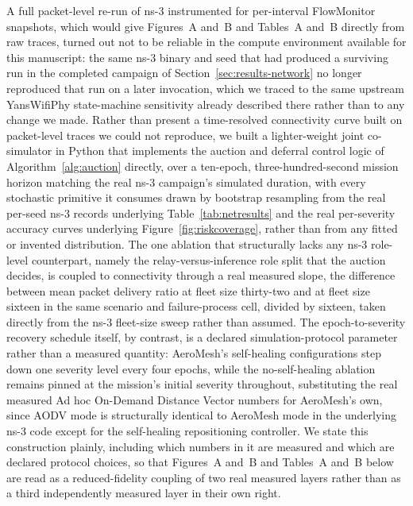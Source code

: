 \documentclass[drones,article,submit,moreauthors]{Definitions/mdpi}
\begin{document}
A full packet-level re-run of ns-3 instrumented for per-interval FlowMonitor snapshots, which would give Figures~A and~B and Tables~A and~B directly from raw traces, turned out not to be reliable in the compute environment available for this manuscript: the same ns-3 binary and seed that had produced a surviving run in the completed campaign of Section~\ref{sec:results-network} no longer reproduced that run on a later invocation, which we traced to the same upstream YansWifiPhy state-machine sensitivity already described there rather than to any change we made. Rather than present a time-resolved connectivity curve built on packet-level traces we could not reproduce, we built a lighter-weight joint co-simulator in Python that implements the auction and deferral control logic of Algorithm~\ref{alg:auction} directly, over a ten-epoch, three-hundred-second mission horizon matching the real ns-3 campaign's simulated duration, with every stochastic primitive it consumes drawn by bootstrap resampling from the real per-seed ns-3 records underlying Table~\ref{tab:netresults} and the real per-severity accuracy curves underlying Figure~\ref{fig:riskcoverage}, rather than from any fitted or invented distribution. The one ablation that structurally lacks any ns-3 role-level counterpart, namely the relay-versus-inference role split that the auction decides, is coupled to connectivity through a real measured slope, the difference between mean packet delivery ratio at fleet size thirty-two and at fleet size sixteen in the same scenario and failure-process cell, divided by sixteen, taken directly from the ns-3 fleet-size sweep rather than assumed. The epoch-to-severity recovery schedule itself, by contrast, is a declared simulation-protocol parameter rather than a measured quantity: AeroMesh's self-healing configurations step down one severity level every four epochs, while the no-self-healing ablation remains pinned at the mission's initial severity throughout, substituting the real measured Ad hoc On-Demand Distance Vector numbers for AeroMesh's own, since AODV mode is structurally identical to AeroMesh mode in the underlying ns-3 code except for the self-healing repositioning controller. We state this construction plainly, including which numbers in it are measured and which are declared protocol choices, so that Figures~A and~B and Tables~A and~B below are read as a reduced-fidelity coupling of two real measured layers rather than as a third independently measured layer in their own right.
\end{document}
